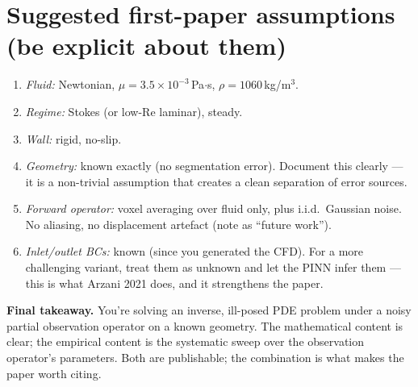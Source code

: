 \documentclass[11pt]{article}
\begin{document}
\section{Suggested first-paper assumptions (be explicit about them)}

\begin{enumerate}[noitemsep]
\item \emph{Fluid:} Newtonian, $\mu = 3.5\times10^{-3}$\,Pa$\cdot$s, $\rho = 1060$\,kg/m$^3$.
\item \emph{Regime:} Stokes (or low-Re laminar), steady.
\item \emph{Wall:} rigid, no-slip.
\item \emph{Geometry:} known exactly (no segmentation error). Document this clearly --- it is a non-trivial assumption that creates a clean separation of error sources.
\item \emph{Forward operator:} voxel averaging over fluid only, plus i.i.d.\ Gaussian noise. No aliasing, no displacement artefact (note as ``future work'').
\item \emph{Inlet/outlet BCs:} known (since you generated the CFD). For a more challenging variant, treat them as unknown and let the PINN infer them --- this is what Arzani 2021 does, and it strengthens the paper.
\end{enumerate}

\textbf{Final takeaway.} You're solving an inverse, ill-posed PDE problem under a noisy partial observation operator on a known geometry. The mathematical content is clear; the empirical content is the systematic sweep over the observation operator's parameters. Both are publishable; the combination is what makes the paper worth citing.
\end{document}
